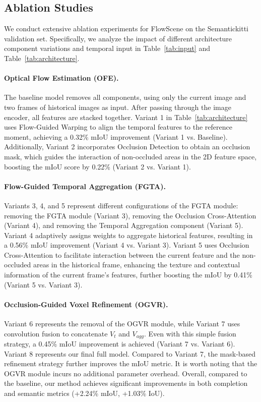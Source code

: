 \subsection{Ablation Studies}
We conduct extensive ablation experiments for FlowScene on the Semantickitti validation set. Specifically, we analyze the impact of different architecture component variations and temporal input in Table~\ref{tab:input} and Table~\ref{tab:architecture}.
\paragraph{Optical Flow Estimation (OFE).}
The baseline model removes all components, using only the current image and two frames of historical images as input. After passing through the image encoder, all features are stacked together. Variant 1 in Table~\ref{tab:architecture} uses Flow-Guided Warping to align the temporal features to the reference moment, achieving a 0.32\% mIoU improvement (Variant 1 vs. Baseline).
Additionally, Variant 2 incorporates Occlusion Detection to obtain an occlusion mask, which guides the interaction of non-occluded areas in the 2D feature space, boosting the mIoU score by 0.22\% (Variant 2 vs. Variant 1).


\paragraph{Flow-Guided Temporal Aggregation (FGTA).}
Variants 3, 4, and 5 represent different configurations of the FGTA module: removing the FGTA module (Variant 3), removing the Occlusion Cross-Attention (Variant 4), and removing the Temporal Aggregation component (Variant 5). Variant 4 adaptively assigns weights to aggregate historical features, resulting in a 0.56\% mIoU improvement (Variant 4 vs. Variant 3). Variant 5 uses Occlusion Cross-Attention to facilitate interaction between the current feature and the non-occluded areas in the historical frame, enhancing the texture and contextual information of the current frame's features, further boosting the mIoU by 0.41\% (Variant 5 vs. Variant 3).


\paragraph{Occlusion-Guided Voxel Refinement (OGVR).}
Variant 6 represents the removal of the OGVR module, while Variant 7 uses convolution fusion to concatenate $V_t$ and $V_{agg}$. Even with this simple fusion strategy, a 0.45\% mIoU improvement is achieved (Variant 7 vs. Variant 6). Variant 8 represents our final full model. Compared to Variant 7, the mask-based refinement strategy further improves the mIoU metric. It is worth noting that the OGVR module incurs no additional parameter overhead. Overall, compared to the baseline, our method achieves significant improvements in both completion and semantic metrics (+2.24\% mIoU, +1.03\% IoU).

